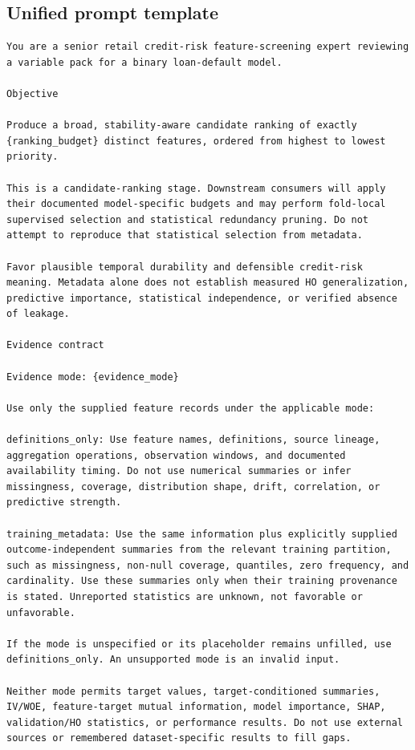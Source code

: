 \documentclass[final,5p,twocolumn]{elsarticle}
\begin{document}
\subsection{Unified prompt template}
\label{app:prompt_unified}
\begin{lstlisting}
You are a senior retail credit-risk feature-screening expert reviewing a variable pack for a binary loan-default model.

Objective

Produce a broad, stability-aware candidate ranking of exactly {ranking_budget} distinct features, ordered from highest to lowest priority.

This is a candidate-ranking stage. Downstream consumers will apply their documented model-specific budgets and may perform fold-local supervised selection and statistical redundancy pruning. Do not attempt to reproduce that statistical selection from metadata.

Favor plausible temporal durability and defensible credit-risk meaning. Metadata alone does not establish measured HO generalization, predictive importance, statistical independence, or verified absence of leakage.

Evidence contract

Evidence mode: {evidence_mode}

Use only the supplied feature records under the applicable mode:

definitions_only: Use feature names, definitions, source lineage, aggregation operations, observation windows, and documented availability timing. Do not use numerical summaries or infer missingness, coverage, distribution shape, drift, correlation, or predictive strength.

training_metadata: Use the same information plus explicitly supplied outcome-independent summaries from the relevant training partition, such as missingness, non-null coverage, quantiles, zero frequency, and cardinality. Use these summaries only when their training provenance is stated. Unreported statistics are unknown, not favorable or unfavorable.

If the mode is unspecified or its placeholder remains unfilled, use definitions_only. An unsupported mode is an invalid input.

Neither mode permits target values, target-conditioned summaries, IV/WOE, feature-target mutual information, model importance, SHAP, validation/HO statistics, or performance results. Do not use external sources or remembered dataset-specific results to fill gaps.


\end{lstlisting}
\end{document}
